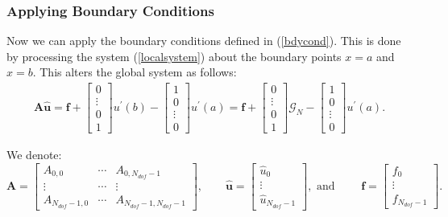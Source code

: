 \subsubsection{Applying Boundary Conditions}

Now we can apply the boundary conditions defined in
(\ref{bdycond}). This is done by processing the system
(\ref{localsystem}) about the boundary points $x = a$ and $x = b$.
This alters the global system as follows:
\begin{eqnarray}
\label{gsystem} {\mathbf A \mathbf{\hat u} = \mathbf f}+
\begin{bmatrix}
    0       \\
    \vdots  \\
    0       \\
    1
\end{bmatrix}
u^{\prime}(b)
-
\begin{bmatrix}
    1       \\
    0       \\
    \vdots  \\
    0
\end{bmatrix}
u^{\prime}(a)
= {\mathbf f}
+
\begin{bmatrix}
    0       \\
    \vdots  \\
    0       \\
    1
\end{bmatrix}
\mathcal{G}_N
-
\begin{bmatrix}
    1       \\
    0       \\
    \vdots  \\
    0
\end{bmatrix}
u^{\prime}(a).
\end{eqnarray}

We denote:
\begin{equation}
\mathbf{A} =
\begin{bmatrix}
    A_{0,0}         &\cdots     & A_{0,N_{dof}-1}   \\
    \vdots          &\cdots     &\vdots             \\
    A_{N_{dof}-1,0} &\cdots     & A_{N_{dof}-1,N_{dof}-1}
\end{bmatrix},
\qquad
\mathbf{\hat u} =
\begin{bmatrix}
    \hat u_0    \\
    \vdots      \\
    \hat u_{N_{dof}-1}
\end{bmatrix},
\mbox{ and }
\qquad
\mathbf{f} =
\begin{bmatrix}
    f_0    \\
    \vdots \\
    f_{N_{dof}-1}
\end{bmatrix}.
\end{equation}



